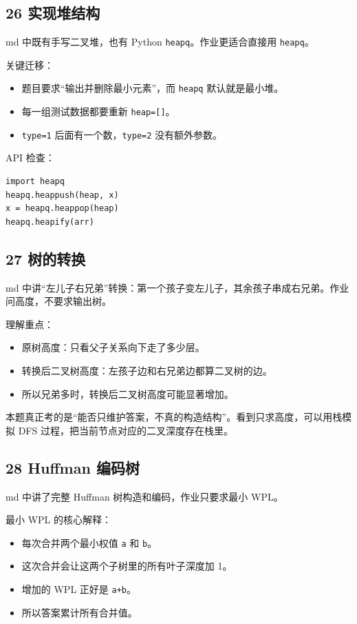 \documentclass[10pt,a4paper,fontset=none]{ctexart}
\begin{document}
\subsection{26 实现堆结构}
md 中既有手写二叉堆，也有 Python \texttt{heapq}。作业更适合直接用 \texttt{heapq}。

关键迁移：
\begin{itemize}
  \item 题目要求“输出并删除最小元素”，而 \texttt{heapq} 默认就是最小堆。
  \item 每一组测试数据都要重新 \texttt{heap=[]}。
  \item \texttt{type=1} 后面有一个数，\texttt{type=2} 没有额外参数。
\end{itemize}

API 检查：
\begin{lstlisting}[style=py]
import heapq
heapq.heappush(heap, x)
x = heapq.heappop(heap)
heapq.heapify(arr)
\end{lstlisting}

\subsection{27 树的转换}
md 中讲“左儿子右兄弟”转换：第一个孩子变左儿子，其余孩子串成右兄弟。作业问高度，不要求输出树。

理解重点：
\begin{itemize}
  \item 原树高度：只看父子关系向下走了多少层。
  \item 转换后二叉树高度：左孩子边和右兄弟边都算二叉树的边。
  \item 所以兄弟多时，转换后二叉树高度可能显著增加。
\end{itemize}

本题真正考的是“能否只维护答案，不真的构造结构”。看到只求高度，可以用栈模拟 DFS 过程，把当前节点对应的二叉深度存在栈里。

\subsection{28 Huffman 编码树}
md 中讲了完整 Huffman 树构造和编码，作业只要求最小 WPL。

最小 WPL 的核心解释：
\begin{itemize}
  \item 每次合并两个最小权值 \texttt{a} 和 \texttt{b}。
  \item 这次合并会让这两个子树里的所有叶子深度加 1。
  \item 增加的 WPL 正好是 \texttt{a+b}。
  \item 所以答案累计所有合并值。
\end{itemize}
\end{document}
